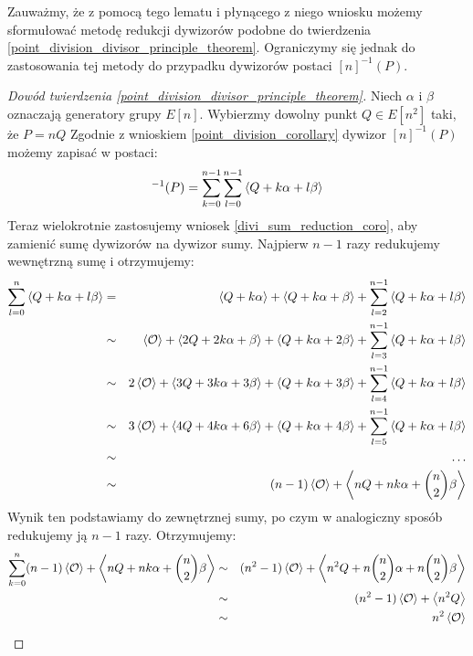Zauważmy, że z pomocą tego lematu i płynącego z niego wniosku
możemy sformułować metodę redukcji dywizorów
podobne do twierdzenia \ref{point_division_divisor_principle_theorem}.
Ograniczymy się jednak do zastosowania tej metody
do przypadku dywizorów postaci $[n]^{-1}(P)$.

\begin{proof}[Dowód twierdzenia \ref{point_division_divisor_principle_theorem}]
Niech $\alpha$ i $\beta$ oznaczają generatory grupy $E[n]$.
Wybierzmy dowolny punkt $Q \in E[n^2]$ taki, że $P = nQ$
Zgodnie z wnioskiem \ref{point_division_corollary}
dywizor $[n]^{-1}(P)$ możemy zapisać w postaci:
\begin{equation*}
[n]^{-1}(P) = \sum_{k=0}^{n-1} \sum_{l=0}^{n-1} \divi{Q + k\alpha + l\beta}
\end{equation*}
Teraz wielokrotnie zastosujemy wniosek \ref{divi_sum_reduction_coro},
aby zamienić sumę dywizorów na dywizor sumy.
Najpierw $n-1$ razy redukujemy wewnętrzną sumę i otrzymujemy:
\begin{eqnarray*}
\sum_{l=0}^n \left\langle Q + k\alpha + l\beta\right\rangle
& =    & \left\langle Q + k\alpha\right\rangle + \left\langle Q + k\alpha + \beta\right\rangle +
         \sum_{l=2}^{n-1} \left\langle Q + k\alpha + l\beta\right\rangle \\
& \sim & \left\langle\mathcal{O}\right\rangle + \left\langle2Q + 2k\alpha + \beta\right\rangle +
         \left\langle Q + k\alpha + 2\beta\right\rangle +
         \sum_{l=3}^{n-1} \left\langle Q + k\alpha + l\beta\right\rangle \\
& \sim & 2\left\langle\mathcal{O}\right\rangle + \left\langle3Q + 3k\alpha + 3\beta\right\rangle +
         \left\langle Q + k\alpha + 3\beta\right\rangle +
         \sum_{l=4}^{n-1} \left\langle Q + k\alpha + l\beta\right\rangle \\
& \sim & 3\left\langle\mathcal{O}\right\rangle + \left\langle4Q + 4k\alpha + 6\beta\right\rangle +
         \left\langle Q + k\alpha + 4\beta\right\rangle +
         \sum_{l=5}^{n-1} \left\langle Q + k\alpha + l\beta\right\rangle \\
& \sim & \ldots \\
& \sim & (n-1)\left\langle\mathcal{O}\right\rangle + \left\langle nQ + nk\alpha + \binom{n}{2}\beta\right\rangle
\end{eqnarray*}
Wynik ten podstawiamy do zewnętrznej sumy,
po czym w analogiczny sposób redukujemy ją $n-1$ razy.
Otrzymujemy:
\begin{eqnarray*}
\sum_{k=0}^n (n-1)\left\langle\mathcal{O}\right\rangle +
             \left\langle nQ + nk\alpha + \binom{n}{2}\beta\right\rangle
& \sim & (n^2-1)\left\langle\mathcal{O}\right\rangle +
         \left\langle n^2Q + n\binom{n}{2}\alpha + n\binom{n}{2}\beta\right\rangle \\
& \sim & (n^2-1)\left\langle\mathcal{O}\right\rangle + \left\langle n^2Q\right\rangle \\
& \sim & n^2\left\langle\mathcal{O}\right\rangle
\end{eqnarray*}
\end{proof}

